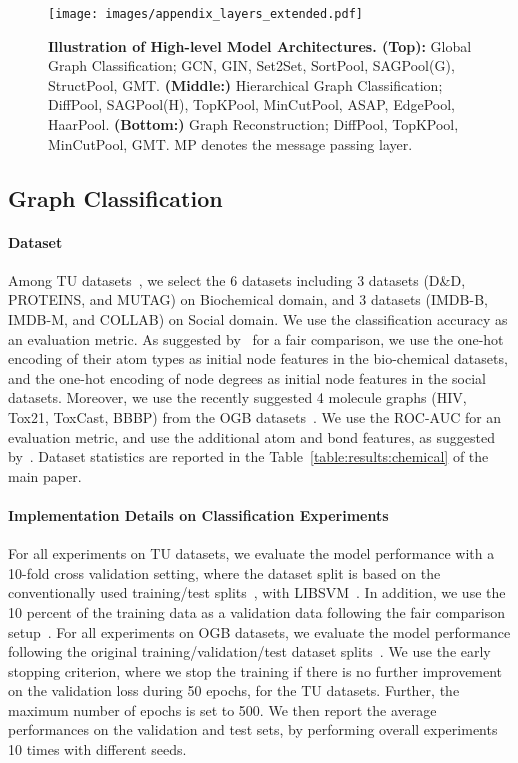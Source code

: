 \begin{figure*}[t]
    \centering
    \texttt{[image: images/appendix\_layers\_extended.pdf]}
    \vskip -0.15in
    \caption{\small \textbf{Illustration of High-level Model Architectures. (Top):} Global Graph Classification; GCN, GIN, Set2Set, SortPool, SAGPool(G), StructPool, GMT. \textbf{(Middle:)} Hierarchical Graph Classification; DiffPool, SAGPool(H), TopKPool, MinCutPool, ASAP, EdgePool, HaarPool. \textbf{(Bottom:)} Graph Reconstruction; DiffPool, TopKPool, MinCutPool, GMT. MP denotes the message passing layer.}
    \vskip -0.15in
    \label{fig:appendix/layers}
\end{figure*}

\subsection{Graph Classification}

\paragraph{Dataset \label{appendix/classification/data}}
Among TU datasets~\citep{classification/datasets}, we select the 6 datasets including 3 datasets (D\&D, PROTEINS, and MUTAG) on Biochemical domain, and 3 datasets (IMDB-B, IMDB-M, and COLLAB) on Social domain. We use the classification accuracy as an evaluation metric. As suggested by~\cite{fair/GNN} for a fair comparison, we use the one-hot encoding of their atom types as initial node features in the bio-chemical datasets, and the one-hot encoding of node degrees as initial node features in the social datasets. Moreover, we use the recently suggested 4 molecule graphs (HIV, Tox21, ToxCast, BBBP) from the OGB datasets~\citep{OGB}. We use the ROC-AUC for an evaluation metric, and use the additional atom and bond features, as suggested by~\citet{OGB}. Dataset statistics are reported in the Table~\ref{table:results:chemical} of the main paper.

\paragraph{Implementation Details on Classification Experiments \label{appendix/classification/implementation}}
For all experiments on TU datasets, we evaluate the model performance with a 10-fold cross validation setting, where the dataset split is based on the conventionally used training/test splits~\citep{TUdataset/split, SortPool, GIN}, with LIBSVM~\citep{LIBSVM}. In addition, we use the 10 percent of the training data as a validation data following the fair comparison setup~\citep{fair/GNN}. For all experiments on OGB datasets, we evaluate the model performance following the original training/validation/test dataset splits~\citep{OGB}. We use the early stopping criterion, where we stop the training if there is no further improvement on the validation loss during 50 epochs, for the TU datasets. Further, the maximum number of epochs is set to 500. We then report the average performances on the validation and test sets, by performing overall experiments 10 times with different seeds.

